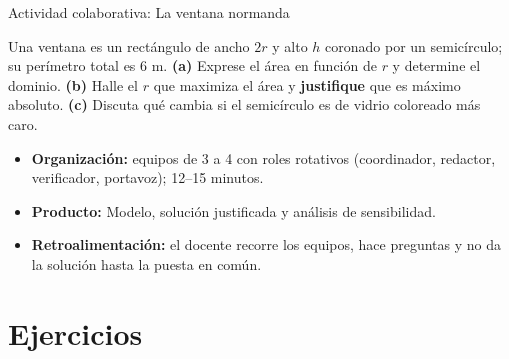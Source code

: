 \documentclass[10pt,aspectratio=169]{beamer}
\begin{document}
\begin{frame}{Actividad colaborativa: La ventana normanda}
  \small
  \begin{activa}
    Una ventana es un rectángulo de ancho $2r$ y alto $h$ coronado por un semicírculo; su perímetro total es 6 m. \textbf{(a)} Exprese el área en función de $r$ y determine el dominio. \textbf{(b)} Halle el $r$ que maximiza el área y \textbf{justifique} que es máximo absoluto. \textbf{(c)} Discuta qué cambia si el semicírculo es de vidrio coloreado más caro.
  \end{activa}
  \begin{itemize}
    \item \textbf{Organización:} equipos de 3 a 4 con roles rotativos (coordinador, redactor, verificador, portavoz); 12--15 minutos.
    \item \textbf{Producto:} Modelo, solución justificada y análisis de sensibilidad.
    \item \textbf{Retroalimentación:} el docente recorre los equipos, hace preguntas y no da la solución hasta la puesta en común.
  \end{itemize}
\end{frame}

\section{Ejercicios}
\end{document}
